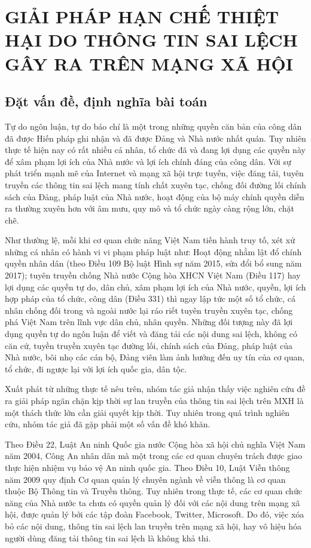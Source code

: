 \chapter{GIẢI PHÁP HẠN CHẾ THIỆT HẠI DO THÔNG TIN SAI LỆCH GÂY RA TRÊN MẠNG XÃ HỘI}

\section{Đặt vấn đề, định nghĩa bài toán}
Tự do ngôn luận, tự do báo chí là một trong những quyền căn bản của công dân đã được Hiến pháp ghi nhận và đã được Đảng và Nhà nước nhất quán. Tuy nhiên thực tế hiện nay có rất nhiều cá nhân, tổ chức đã và đang lợi dụng các quyền này để xâm phạm lợi ích của Nhà nước và lợi ích chính đáng của công dân. Với sự phát triển mạnh mẽ của Internet và mạng xã hội trực tuyến, việc đăng tải, tuyên truyền các thông tin sai lệch mang tính chất xuyên tạc, chống đối đường lối chính sách của Đảng, pháp luật của Nhà nước, hoạt động của bộ máy chính quyền diễn ra thường xuyên hơn với âm mưu, quy mô và tổ chức ngày càng rộng lớn, chặt chẽ.

Như thường lệ, mỗi khi cơ quan chức năng Việt Nam tiến hành truy tố, xét xử những cá nhân có hành vi vi phạm pháp luật như: Hoạt động nhằm lật đổ chính quyền nhân dân (theo Điều 109 Bộ luật Hình sự năm 2015, sửa đổi bổ sung năm 2017); tuyên truyền chống Nhà nước Cộng hòa XHCN Việt Nam (Điều 117) hay lợi dụng các quyền tự do, dân chủ, xâm phạm lợi ích của Nhà nước, quyền, lợi ích hợp pháp của tổ chức, công dân (Điều 331) thì ngay lập tức một số tổ chức, cá nhân chống đối trong và ngoài nước lại ráo riết tuyên truyền xuyên tạc, chống phá Việt Nam trên lĩnh vực dân chủ, nhân quyền. Những đối tượng này đã lợi dụng quyền tự do ngôn luận để viết và đăng tải các nội dung sai lệch, không có căn cứ, tuyền truyền xuyên tạc đường lối, chính sách của Đảng, pháp luật của Nhà nước, bôi nhọ các cán bộ, Đảng viên làm ảnh hưởng đến uy tín của cơ quan, tổ chức, đi ngược lại với lợi ích quốc gia, dân tộc.

Xuất phát từ những thực tế nêu trên, nhóm tác giả nhận thấy việc nghiên cứu đề ra giải pháp ngăn chặn kịp thời sự lan truyền của thông tin sai lệch trên MXH là một thách thức lớn cần giải quyết kịp thời. Tuy nhiên trong quá trình nghiên cứu, nhóm tác giả đã gặp phải một số vấn đề khó khăn.

Theo Điều 22, Luật An ninh Quốc gia nước Cộng hòa xã hội chủ nghĩa Việt Nam năm 2004, Công An nhân dân mà một trong các cơ quan chuyên trách được giao thực hiện nhiệm vụ bảo vệ An ninh quốc gia. Theo Điều 10, Luật Viễn thông năm 2009 quy định Cơ quan quản lý chuyên ngành về viễn thông là cơ quan thuộc Bộ Thông tin và Truyền thông. Tuy nhiên trong thực tế, các cơ quan chức năng của Nhà nước ta chưa có quyền quản lý đối với các nội dung trên mạng xã hội, được quản lý bởi các tập đoàn Facebook, Twitter, Microsoft. Do đó, việc xóa bỏ các nội dung, thông tin sai lệch lan truyền trên mạng xã hội, hay vô hiệu hóa người dùng đăng tải thông tin sai lệch là không khả thi. 

